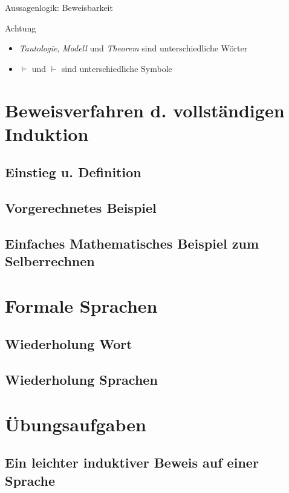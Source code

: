 \begin{frame}{Aussagenlogik: Beweisbarkeit}    
	\begin{alertblock}{Achtung}
		\begin{itemize}
			\item \emph{Tautologie}, \emph{Modell} und \emph{Theorem} sind unterschiedliche Wörter
			\item $\models$ und $\vdash$ sind unterschiedliche Symbole
		\end{itemize}
	\end{alertblock}
\end{frame}

\section[Vollständige Induktion]{Beweisverfahren d. vollständigen Induktion}
\subsection{Einstieg u. Definition}
\subsection{Vorgerechnetes Beispiel}
\subsection{Einfaches Mathematisches Beispiel zum Selberrechnen}

\section{Formale Sprachen}
\subsection{Wiederholung Wort} %
\subsection{Wiederholung Sprachen} %

\section{Übungsaufgaben}
\subsection{Ein leichter induktiver Beweis auf einer Sprache}
